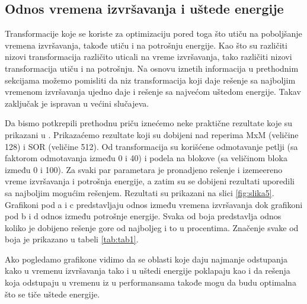 \documentclass[a4paper]{article}
\begin{document}
\subsection{Odnos vremena izvršavanja i uštede energije}
\label{sec:naslov}
Transformacije koje se koriste za optimizaciju pored toga što utiču na poboljšanje vremena izvršavanja,
 takođe utiču i na potrošnju energije. Kao što su različiti nizovi transformacija različito uticali na vreme izvršavanja, 
 tako različiti nizovi transformacija utiču i na potrošnju. Na osnovu iznetih informacija u prethodnim sekcijama možemo 
 pomisliti da niz transformacija koji daje rešenje sa najboljim vremenom izvršavanja
 ujedno daje i rešenje sa najvećom uštedom energije. Takav zaključak je ispravan u većini slučajeva.
\par
Da bismo potkrepili prethodnu priču iznećemo neke praktične rezultate koje su prikazani u \cite{gheorghita2005iterative}.
Prikazaćemo rezultate koji su dobijeni nad reperima MxM (veličine 128) i SOR (veličine 512). Od transformacija 
su korišćene odmotavanje petlji (sa faktorom odmotavanja između 0 i 40) i podela na blokove (sa veličinom bloka između 0 i 100).
Za svaki par parametara je pronadjeno rešenje i izemeereno vreme izvršavanja i potrošnja energije, a zatim su se dobijeni rezultati 
uporedili sa najboljim mogućim rešenjem. Rezultati su prikazani na slici \ref{fig:slika5}. 
Grafikoni pod a i c predstavljaju odnos između vremena izvršavanja dok grafikoni pod b i d odnos između potrošnje energije.
Svaka od boja predstavlja odnos koliko je dobijeno rešenje gore od najboljeg i to u procentima. 
Značenje svake od boja je prikazano u tabeli \ref{tab:tab1}.

\par
Ako pogledamo grafikone vidimo da se oblasti koje daju najmanje odstupanja kako u vremenu izvršavanja tako i u uštedi energije poklapaju
kao i da rešenja koja odstupaju u vremenu iz u performansama takođe mogu da budu optimalna što se tiče uštede energije.
\end{document}
